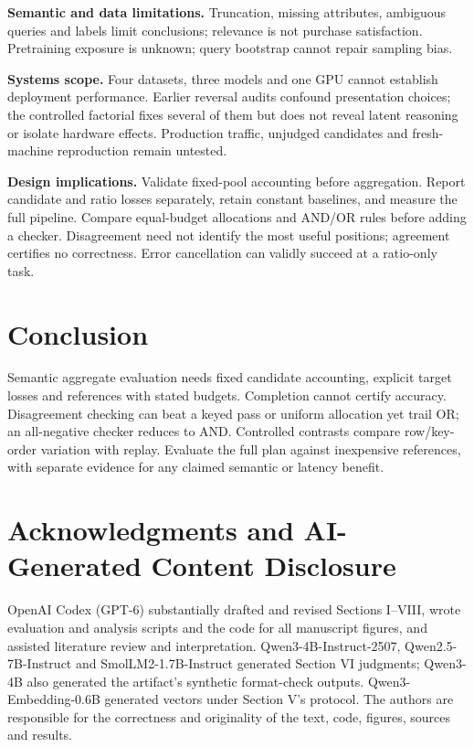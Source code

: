 \documentclass[conference]{IEEEtran}
\begin{document}
\textbf{Semantic and data limitations.} Truncation, missing attributes, ambiguous queries and labels limit conclusions; relevance is not purchase satisfaction. Pretraining exposure is unknown; query bootstrap cannot repair sampling bias.

\textbf{Systems scope.} Four datasets, three models and one GPU cannot establish deployment performance. Earlier reversal audits confound presentation choices; the controlled factorial fixes several of them but does not reveal latent reasoning or isolate hardware effects. Production traffic, unjudged candidates and fresh-machine reproduction remain untested.

\textbf{Design implications.} Validate fixed-pool accounting before aggregation. Report candidate and ratio losses separately, retain constant baselines, and measure the full pipeline. Compare equal-budget allocations and AND/OR rules before adding a checker. Disagreement need not identify the most useful positions; agreement certifies no correctness. Error cancellation can validly succeed at a ratio-only task.

\section{Conclusion}
Semantic aggregate evaluation needs fixed candidate accounting, explicit target losses and references with stated budgets. Completion cannot certify accuracy. Disagreement checking can beat a keyed pass or uniform allocation yet trail OR; an all-negative checker reduces to AND. Controlled contrasts compare row/key-order variation with replay. Evaluate the full plan against inexpensive references, with separate evidence for any claimed semantic or latency benefit.

\section*{Acknowledgments and AI-Generated Content Disclosure}
OpenAI Codex (GPT-6) substantially drafted and revised Sections I--VIII, wrote evaluation and analysis scripts and the code for all manuscript figures, and assisted literature review and interpretation. Qwen3-4B-Instruct-2507, Qwen2.5-7B-Instruct and SmolLM2-1.7B-Instruct generated Section VI judgments; Qwen3-4B also generated the artifact's synthetic format-check outputs. Qwen3-Embedding-0.6B generated vectors under Section V's protocol. The authors are responsible for the correctness and originality of the text, code, figures, sources and results.
\end{document}
